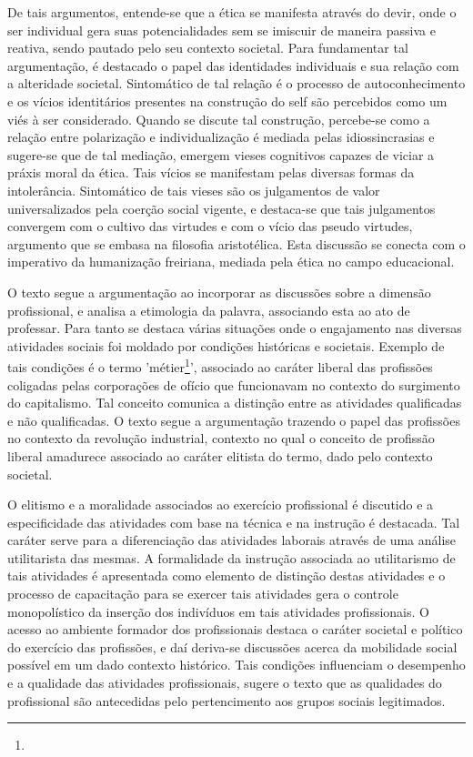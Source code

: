\documentclass[
   article,       %
   12pt,          %
   oneside,       %
   a4paper,       %
   english,       %
   brazil,           %
   sumario=tradicional
   ]{abntex2}
\begin{document}
De tais argumentos, entende-se que a ética se manifesta através do devir, onde o ser individual gera suas potencialidades sem se imiscuir de maneira passiva e reativa, sendo pautado pelo seu contexto societal. Para fundamentar tal argumentação, é destacado o papel das identidades individuais e sua relação com a alteridade societal. Sintomático de tal relação é o processo de autoconhecimento e os vícios identitários presentes na construção do self são percebidos como um viés à ser considerado. Quando se discute tal construção, percebe-se como a relação entre polarização e individualização é mediada pelas idiossincrasias e sugere-se que de tal mediação, emergem vieses cognitivos capazes de viciar a práxis moral da ética. Tais vícios se manifestam pelas diversas formas da intolerância. Sintomático de tais vieses são os julgamentos de valor universalizados pela coerção social vigente, e destaca-se que tais julgamentos convergem com o cultivo das virtudes e com o vício das pseudo virtudes, argumento que se embasa na filosofia aristotélica. Esta discussão se conecta com o imperativo da humanização freiriana, mediada pela ética no campo educacional.

O texto segue a argumentação ao incorporar as discussões sobre a dimensão profissional, e analisa a etimologia da palavra, associando esta ao ato de professar. Para tanto se destaca várias situações onde o engajamento nas diversas atividades sociais foi moldado por condições históricas e societais. Exemplo de tais condições é o termo 'métier\footnote{}', associado ao caráter liberal das profissões coligadas pelas corporações de ofício que funcionavam no contexto do surgimento do capitalismo. Tal conceito comunica a distinção entre as atividades qualificadas e não qualificadas. O texto segue a argumentação trazendo o papel das profissões no contexto da revolução industrial, contexto no qual o conceito de profissão liberal amadurece associado ao caráter elitista do termo, dado pelo contexto societal. 

O elitismo e a moralidade associados ao exercício profissional é discutido e a especificidade das atividades com base na técnica e na instrução é destacada. Tal caráter serve para a diferenciação das atividades laborais através de uma análise utilitarista das mesmas. A formalidade da instrução associada ao utilitarismo de tais atividades é apresentada como elemento de distinção destas atividades e o processo de capacitação para se exercer tais atividades gera o controle monopolístico da inserção dos indivíduos em tais atividades profissionais. O acesso ao ambiente formador dos profissionais destaca o caráter societal e político do exercício das profissões, e daí deriva-se discussões acerca da mobilidade social possível em um dado contexto histórico. Tais condições influenciam o desempenho e a qualidade das atividades profissionais, sugere o texto que as qualidades do profissional são antecedidas pelo pertencimento aos grupos sociais legitimados.
\end{document}
